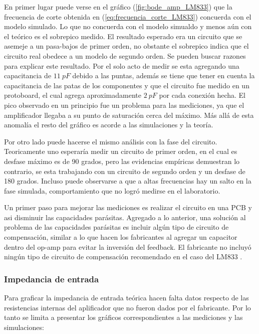 

En primer lugar puede verse en el gráfico (\ref{fig:bode_amp_LM833}) que la frecuencia de corte obtenida en (\ref{eq:frecuencia_corte_LM833}) concuerda con el modelo simulado. Lo que no concuerda con el modelo simualdo y menos aún con el teórico es el sobrepico medido. El resultado esperado era un circuito que se asemeje a un pasa-bajos de primer orden, no obstante el sobrepico indica que el circuito real obedece a un modelo de segundo orden. Se pueden buscar razones para explicar este resultado. Por el solo acto de medir se esta agregando una capacitancia de $11 \ pF$ debido a las puntas, además se tiene que tener en cuenta la capacitancia de las patas de los componentes y que el circuito fue medido en un protoboard, el cual agrega aproximadamente $2 \ pF$ por cada conexión hecha. El pico observado en un principio fue un problema para las mediciones, ya que el amplificador llegaba a su punto de saturación cerca del máximo. Más allá de esta anomalía el resto del gráfico es acorde a las simulaciones y la teoría. 

Por otro lado puede hacerse el mismo análisis con la fase del circuito. Teoricamente uno esperaría medir un circuito de primer orden, en el cual es desfase máximo es de 90 grados, pero las evidencias empíricas demuestran lo contrario, se esta trabajando con un circuito de segundo orden y un desfase de 180 grados. Incluso puede observarse a que a altas frecuencias hay un salto en la fase simulada, comportamiento que no logró medirse en el laboratorio.

Un primer paso para mejorar las mediciones es realizar el circuito en una PCB y asi disminuir las capacidades parásitas. Agregado a lo anterior, una solución al problema de las capacidades parásitas es incluir algún tipo de circuito de compensación, similar a lo que hacen los fabricantes al agregar un capacitor dentro del op-amp para evitar la inversión del feedback. El fabricante no incluyó ningún tipo de circuito de compensación recomendado en el caso del LM833 .

\subsubsection{Impedancia de entrada}

Para graficar la impedancia de entrada teórica hacen falta datos respecto de las resistencias internas del aplificador que no fueron dados por el fabricante. Por lo tanto se limita a presentar los gráficos correspondientes a las mediciones y las simulaciones:

